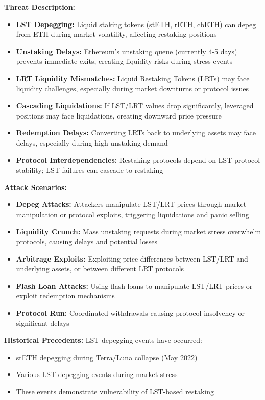 \documentclass[runningheads]{llncs}
\begin{document}
\textbf{Threat Description:}
\begin{itemize}
    \item \textbf{LST Depegging:} Liquid staking tokens (stETH, rETH, cbETH) can depeg from ETH during market volatility, affecting restaking positions
    \item \textbf{Unstaking Delays:} Ethereum's unstaking queue (currently 4-5 days) prevents immediate exits, creating liquidity risks during stress events
    \item \textbf{LRT Liquidity Mismatches:} Liquid Restaking Tokens (LRTs) may face liquidity challenges, especially during market downturns or protocol issues
    \item \textbf{Cascading Liquidations:} If LST/LRT values drop significantly, leveraged positions may face liquidations, creating downward price pressure
    \item \textbf{Redemption Delays:} Converting LRTs back to underlying assets may face delays, especially during high unstaking demand
    \item \textbf{Protocol Interdependencies:} Restaking protocols depend on LST protocol stability; LST failures can cascade to restaking
\end{itemize}

\textbf{Attack Scenarios:}
\begin{itemize}
    \item \textbf{Depeg Attacks:} Attackers manipulate LST/LRT prices through market manipulation or protocol exploits, triggering liquidations and panic selling
    \item \textbf{Liquidity Crunch:} Mass unstaking requests during market stress overwhelm protocols, causing delays and potential losses
    \item \textbf{Arbitrage Exploits:} Exploiting price differences between LST/LRT and underlying assets, or between different LRT protocols
    \item \textbf{Flash Loan Attacks:} Using flash loans to manipulate LST/LRT prices or exploit redemption mechanisms
    \item \textbf{Protocol Run:} Coordinated withdrawals causing protocol insolvency or significant delays
\end{itemize}

\textbf{Historical Precedents:}
LST depegging events have occurred:
\begin{itemize}
    \item stETH depegging during Terra/Luna collapse (May 2022)
    \item Various LST depegging events during market stress
    \item These events demonstrate vulnerability of LST-based restaking
\end{itemize}
\end{document}
